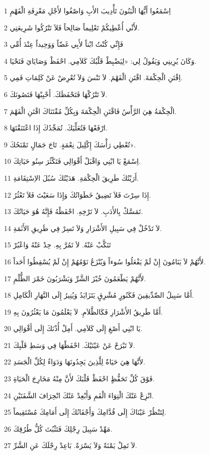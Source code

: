 \par 1 اِسْمَعُوا أَيُّهَا الْبَنُونَ تَأْدِيبَ الأَبِ وَاصْغُوا لأَجْلِ مَعْرِفَةِ الْفَهْمِ
\par 2 لأَنِّي أُعْطِيكُمْ تَعْلِيماً صَالِحاً فَلاَ تَتْرُكُوا شَرِيعَتِي.
\par 3 فَإِنِّي كُنْتُ ابْناً لأَبِي غَضّاً وَوَحِيداً عِنْدَ أُمِّي
\par 4 وَكَانَ يُرِينِي وَيَقُولُ لِي: «لِيَضْبِطْ قَلْبُكَ كَلاَمِي. احْفَظْ وَصَايَايَ فَتَحْيَا.
\par 5 اِقْتَنِ الْحِكْمَةَ. اقْتَنِ الْفَهْمَ. لاَ تَنْسَ وَلاَ تُعْرِضْ عَنْ كَلِمَاتِ فَمِي.
\par 6 لاَ تَتْرُكْهَا فَتَحْفَظَكَ. أَحْبِبْهَا فَتَصُونَكَ.
\par 7 الْحِكْمَةُ هِيَ الرَّأْسُ فَاقْتَنِ الْحِكْمَةَ وَبِكُلِّ مُقْتَنَاكَ اقْتَنِ الْفَهْمَ.
\par 8 ارْفَعْهَا فَتُعَلِّيَكَ. تُمَجِّدُكَ إِذَا اعْتَنَقْتَهَا.
\par 9 تُعْطِي رَأْسَكَ إِكْلِيلَ نِعْمَةٍ. تَاجَ جَمَالٍ تَمْنَحُكَ».
\par 10 اِسْمَعْ يَا ابْنِي وَاقْبَلْ أَقْوَالِي فَتَكْثُرَ سِنُو حَيَاتِكَ.
\par 11 أَرَيْتُكَ طَرِيقَ الْحِكْمَةِ. هَدَيْتُكَ سُبُلَ الاِسْتِقَامَةِ.
\par 12 إِذَا سِرْتَ فَلاَ تَضِيقُ خَطَوَاتُكَ وَإِذَا سَعَيْتَ فَلاَ تَعْثُرُ.
\par 13 تَمَسَّكْ بِالأَدَبِ. لاَ تَرْخِهِ. احْفَظْهُ فَإِنَّهُ هُوَ حَيَاتُكَ.
\par 14 لاَ تَدْخُلْ فِي سَبِيلِ الأَشْرَارِ وَلاَ تَسِرْ فِي طَرِيقِ الأَثَمَةِ.
\par 15 تَنَكَّبْ عَنْهُ. لاَ تَمُرَّ بِهِ. حِدْ عَنْهُ وَاعْبُرْ
\par 16 لأَنَّهُمْ لاَ يَنَامُونَ إِنْ لَمْ يَفْعَلُوا سُوءاً وَيُنْزَعُ نَوْمُهُمْ إِنْ لَمْ يُسْقِطُوا أَحَداً.
\par 17 لأَنَّهُمْ يَطْعَمُونَ خُبْزَ الشَّرِّ وَيَشْرَبُونَ خَمْرَ الظُّلْمِ.
\par 18 أَمَّا سَبِيلُ الصِّدِّيقِينَ فَكَنُورٍ مُشْرِقٍ يَتَزَايَدُ وَيُنِيرُ إِلَى النَّهَارِ الْكَامِلِ.
\par 19 أَمَّا طَرِيقُ الأَشْرَارِ فَكَالظَّلاَمِ. لاَ يَعْلَمُونَ مَا يَعْثُرُونَ بِهِ.
\par 20 يَا ابْنِي أَصْغِ إِلَى كَلاَمِي. أَمِلْ أُذْنَكَ إِلَى أَقْوَالِي.
\par 21 لاَ تَبْرَحْ عَنْ عَيْنَيْكَ. احْفَظْهَا فِي وَسَطِ قَلْبِكَ.
\par 22 لأَنَّهَا هِيَ حَيَاةٌ لِلَّذِينَ يَجِدُونَهَا وَدَوَاءٌ لِكُلِّ الْجَسَدِ.
\par 23 فَوْقَ كُلِّ تَحَفُّظٍ احْفَظْ قَلْبَكَ لأَنَّ مِنْهُ مَخَارِجَ الْحَيَاةِ.
\par 24 انْزِعْ عَنْكَ الْتِوَاءَ الْفَمِ وَأَبْعِدْ عَنْكَ انْحِرَافَ الشَّفَتَيْنِ.
\par 25 لِتَنْظُرْ عَيْنَاكَ إِلَى قُدَّامِكَ وَأَجْفَانُكَ إِلَى أَمَامِكَ مُسْتَقِيماً.
\par 26 مَهِّدْ سَبِيلَ رِجْلِكَ فَتَثْبُتَ كُلُّ طُرُقِكَ.
\par 27 لاَ تَمِلْ يَمْنَةً وَلاَ يَسْرَةً. بَاعِدْ رِجْلَكَ عَنِ الشَّرِّ.

